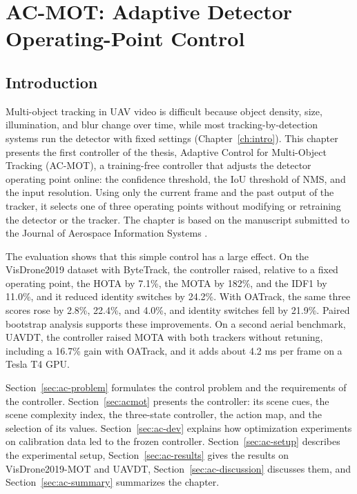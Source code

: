 \chapter{AC-MOT: Adaptive Detector Operating-Point Control}\label{ch:acmot}

\section{Introduction}\label{sec:ac-intro}
Multi-object tracking in UAV video is difficult because object density, size, illumination, and blur change over time, while most tracking-by-detection systems run the detector with fixed settings (Chapter~\ref{ch:intro}). This chapter presents the first controller of the thesis, Adaptive Control for Multi-Object Tracking (AC-MOT), a training-free controller that adjusts the detector operating point online: the confidence threshold, the IoU threshold of NMS, and the input resolution. Using only the current frame and the past output of the tracker, it selects one of three operating points without modifying or retraining the detector or the tracker. The chapter is based on the manuscript submitted to the Journal of Aerospace Information Systems \cite{ismail2026acmot}.

The evaluation shows that this simple control has a large effect. On the VisDrone2019 dataset with ByteTrack, the controller raised, relative to a fixed operating point, the HOTA by 7.1\%, the MOTA by 182\%, and the IDF1 by 11.0\%, and it reduced identity switches by 24.2\%. With OATrack, the same three scores rose by 2.8\%, 22.4\%, and 4.0\%, and identity switches fell by 21.9\%. Paired bootstrap analysis supports these improvements. On a second aerial benchmark, UAVDT, the controller raised MOTA with both trackers without retuning, including a 16.7\% gain with OATrack, and it adds about 4.2 ms per frame on a Tesla T4 GPU.

Section~\ref{sec:ac-problem} formulates the control problem and the requirements of the controller. Section~\ref{sec:acmot} presents the controller: its scene cues, the scene complexity index, the three-state controller, the action map, and the selection of its values. Section~\ref{sec:ac-dev} explains how optimization experiments on calibration data led to the frozen controller. Section~\ref{sec:ac-setup} describes the experimental setup, Section~\ref{sec:ac-results} gives the results on VisDrone2019-MOT and UAVDT, Section~\ref{sec:ac-discussion} discusses them, and Section~\ref{sec:ac-summary} summarizes the chapter.

